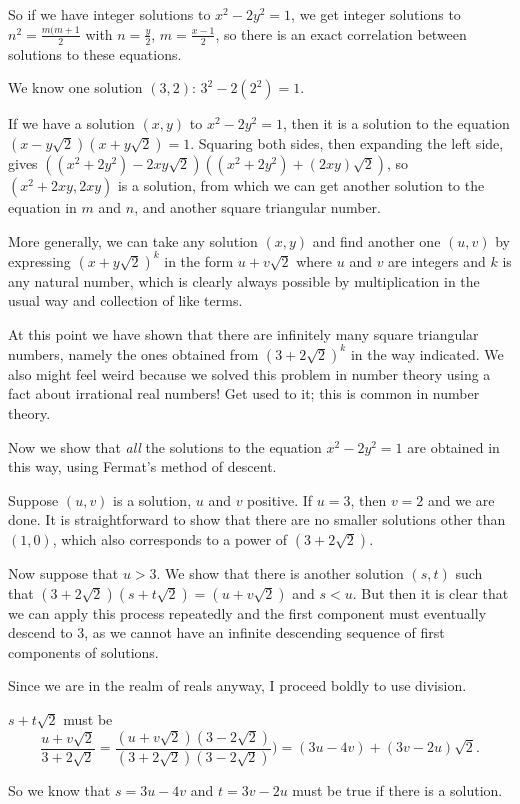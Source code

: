 \documentclass[12pt]{article}
\begin{document}
So if we have integer solutions to $x^2-2y^2=1$, we get integer solutions to $n^2=\frac{m(m+1}2$ with $n=\frac y2$, $m=\frac{x-1}2$, so there is an exact correlation between solutions to these equations.

We know one solution $(3,2)$:   $3^2-2(2^2)=1$.

If we have a solution $(x,y)$ to $x^2-2y^2=1$, then it is a solution to the equation $(x-y\sqrt2)(x+y\sqrt2)=1$.   Squaring both sides, then expanding the left side, gives $((x^2+2y^2)-2xy\sqrt2)((x^2+2y^2)+(2xy)\sqrt2)$, so $(x^2+2xy,2xy)$ is a solution, from which we can get another solution to the equation in $m$ and $n$, and another square triangular number.

More generally, we can take any solution $(x,y)$ and find another one $(u,v)$ by expressing $(x+ y\sqrt2)^k$ in the form $u+v\sqrt2$ where $u$ and $v$ are integers and $k$ is any natural number, which is clearly always possible by multiplication in the usual way and collection of like terms.

At this  point we have shown that there are infinitely many square triangular numbers, namely the ones obtained from $(3+2\sqrt2)^k$ in the way indicated.  We also might feel weird because we solved this problem in number theory using a fact about irrational real numbers!  Get used to it; this is common in number theory.

Now we show that {\em all\/} the solutions to the equation $x^2-2y^2=1$ are obtained in this way, using Fermat's method of descent.

Suppose $(u,v)$ is a solution, $u$ and $v$ positive.   If $u=3$, then $v=2$ and we are done.  It is straightforward to show that there are no smaller solutions
other than $(1,0)$, which also corresponds to a power of $(3+2\sqrt2)$.

Now suppose that $u>3$.  We show that there is another solution $(s,t)$ such that $(3+2\sqrt2)(s+t\sqrt2)=(u+v\sqrt2)$  and $s<u$.  But then it is clear that we can apply this process repeatedly and the first component must eventually descend to 3, as we cannot have an infinite descending sequence of first components of solutions.

Since we are in the realm of reals anyway, I proceed boldly to use division.

$s+t\sqrt2$ must be $$\frac{u+v\sqrt2}{3+2\sqrt2} = \frac{(u+v\sqrt2)(3-2\sqrt2)}{(3+2\sqrt2)(3-2\sqrt2)})=(3u-4v)+(3v-2u)\sqrt2.$$

So we know that $s=3u-4v$ and $t=3v-2u$ must be true if there is a solution.
\end{document}
